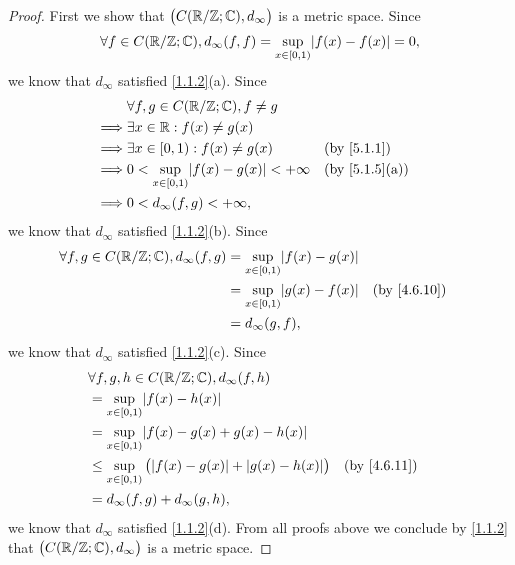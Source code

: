 \begin{proof}
  First we show that \(\big(C(\mathbb{R} / \mathbb{Z} ; \mathbb{C}), d_\infty\big)\) is a metric space.
  Since
  \[
    \forall f \in C(\R / \Z ; \C), d_\infty(f, f) = \sup_{x \in [0, 1)} \abs{f(x) - f(x)} = 0,
  \]
  we know that \(d_\infty\) satisfied \cref{1.1.2}(a).
  Since
  \begin{align*}
             & \forall f, g \in C(\R / \Z ; \C), f \neq g                                           \\
    \implies & \exists x \in \R : f(x) \neq g(x)                                                    \\
    \implies & \exists x \in [0, 1) : f(x) \neq g(x)               &  & \by{5.1.1}                  \\
    \implies & 0 < \sup_{x \in [0, 1)} \abs{f(x) - g(x)} < +\infty &  & \text{(by \cref{5.1.5}(a))} \\
    \implies & 0 < d_\infty(f, g) < +\infty,
  \end{align*}
  we know that \(d_\infty\) satisfied \cref{1.1.2}(b).
  Since
  \begin{align*}
    \forall f, g \in C(\R / \Z ; \C), d_\infty(f, g) & = \sup_{x \in [0, 1)} \abs{f(x) - g(x)}                  \\
                                                     & = \sup_{x \in [0, 1)} \abs{g(x) - f(x)} &  & \by{4.6.10} \\
                                                     & = d_\infty(g, f),
  \end{align*}
  we know that \(d_\infty\) satisfied \cref{1.1.2}(c).
  Since
  \begin{align*}
     & \forall f, g, h \in C(\R / \Z ; \C), d_\infty(f, h)                                       \\
     & = \sup_{x \in [0, 1)} \abs{f(x) - h(x)}                                                   \\
     & = \sup_{x \in [0, 1)} \abs{f(x) - g(x) + g(x) - h(x)}                                     \\
     & \leq \sup_{x \in [0, 1)} \big(\abs{f(x) - g(x)} + \abs{g(x) - h(x)}\big) &  & \by{4.6.11} \\
     & = d_\infty(f, g) + d_\infty(g, h),
  \end{align*}
  we know that \(d_\infty\) satisfied \cref{1.1.2}(d).
  From all proofs above we conclude by \cref{1.1.2} that \(\big(C(\mathbb{R} / \mathbb{Z} ; \mathbb{C}), d_\infty\big)\) is a metric space.


\end{proof}
